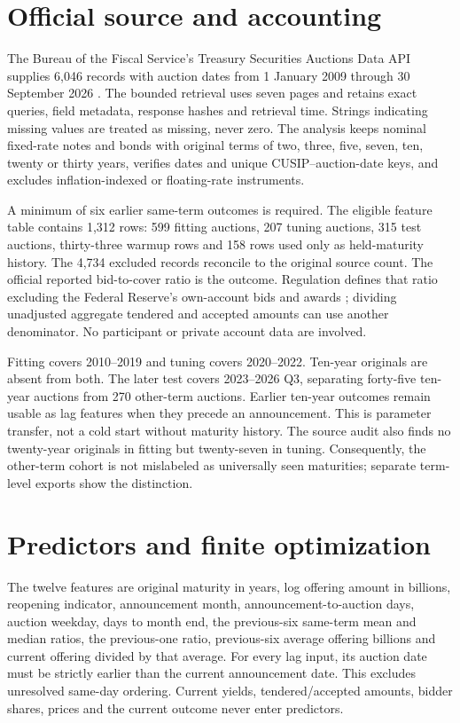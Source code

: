 \documentclass[11pt]{article}
\begin{document}
\section{Official source and accounting}
The Bureau of the Fiscal Service's Treasury Securities Auctions Data API supplies 6,046 records with auction dates from 1 January 2009 through 30 September 2026 \cite{treasury}. The bounded retrieval uses seven pages and retains exact queries, field metadata, response hashes and retrieval time. Strings indicating missing values are treated as missing, never zero. The analysis keeps nominal fixed-rate notes and bonds with original terms of two, three, five, seven, ten, twenty or thirty years, verifies dates and unique CUSIP--auction-date keys, and excludes inflation-indexed or floating-rate instruments.

A minimum of six earlier same-term outcomes is required. The eligible feature table contains 1,312 rows: 599 fitting auctions, 207 tuning auctions, 315 test auctions, thirty-three warmup rows and 158 rows used only as held-maturity history. The 4,734 excluded records reconcile to the original source count. The official reported bid-to-cover ratio is the outcome. Regulation defines that ratio excluding the Federal Reserve's own-account bids and awards \cite{definition}; dividing unadjusted aggregate tendered and accepted amounts can use another denominator. No participant or private account data are involved.

Fitting covers 2010--2019 and tuning covers 2020--2022. Ten-year originals are absent from both. The later test covers 2023--2026 Q3, separating forty-five ten-year auctions from 270 other-term auctions. Earlier ten-year outcomes remain usable as lag features when they precede an announcement. This is parameter transfer, not a cold start without maturity history. The source audit also finds no twenty-year originals in fitting but twenty-seven in tuning. Consequently, the other-term cohort is not mislabeled as universally seen maturities; separate term-level exports show the distinction.
\section{Predictors and finite optimization}
The twelve features are original maturity in years, log offering amount in billions, reopening indicator, announcement month, announcement-to-auction days, auction weekday, days to month end, the previous-six same-term mean and median ratios, the previous-one ratio, previous-six average offering billions and current offering divided by that average. For every lag input, its auction date must be strictly earlier than the current announcement date. This excludes unresolved same-day ordering. Current yields, tendered/accepted amounts, bidder shares, prices and the current outcome never enter predictors.
\end{document}
